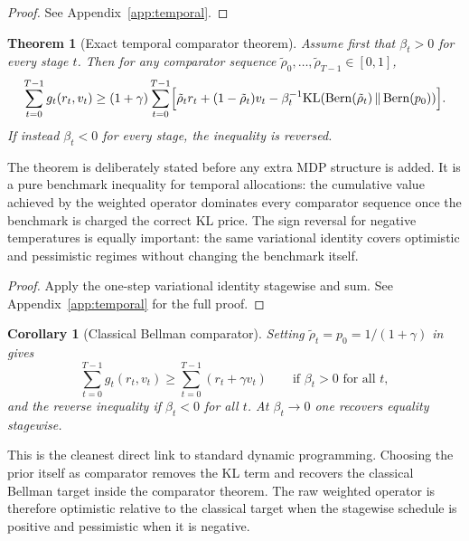 \documentclass{article}
\newtheorem{theorem}{Theorem}[section]
\newtheorem{corollary}[corollary]{Corollary}
\theoremstyle{remark}
\DeclareMathOperator{\Bern}{Bern}
\newcommand{\KL}{\mathrm{KL}}
\newcommand{\pprior}{p_0}
\newcommand{\KLbin}[2]{\KL\!\left(\Bern(#1)\,\middle\|\,\Bern(#2)\right)}
\begin{document}
\begin{proof}
See Appendix~\ref{app:temporal}.
\end{proof}

\begin{theorem}[Exact temporal comparator theorem]
\label{thm:temporal-comparator}
Assume first that $\beta_t>0$ for every stage $t$.
Then for any comparator sequence $\tilde\rho_0,\dots,\tilde\rho_{T-1}\in[0,1]$,
\begin{equation}
\sum_{t=0}^{T-1} g_t(r_t,v_t)
\ge
(1+\gamma)
\sum_{t=0}^{T-1}
\Bigl[
\tilde\rho_t r_t + (1-\tilde\rho_t)v_t - \beta_t^{-1}\KLbin{\tilde\rho_t}{\pprior}
\Bigr].
\label{eq:temporal-comparator-pos}
\end{equation}
If instead $\beta_t<0$ for every stage, the inequality is reversed.
\end{theorem}

The theorem is deliberately stated before any extra MDP structure is added.
It is a pure benchmark inequality for temporal allocations: the cumulative value achieved by the weighted operator dominates every comparator sequence once the benchmark is charged the correct KL price.
The sign reversal for negative temperatures is equally important: the same variational identity covers optimistic and pessimistic regimes without changing the benchmark itself.

\begin{proof}
Apply the one-step variational identity stagewise and sum.
See Appendix~\ref{app:temporal} for the full proof.
\end{proof}

\begin{corollary}[Classical Bellman comparator]
\label{cor:classical-comparator}
Setting $\tilde\rho_t=\pprior=1/(1+\gamma)$ in  gives
\begin{equation}
\sum_{t=0}^{T-1} g_t(r_t,v_t)
\ge
\sum_{t=0}^{T-1}(r_t+\gamma v_t)
\qquad\text{if } \beta_t>0 \text{ for all } t,
\label{eq:classical-comparator-pos}
\end{equation}
and the reverse inequality if $\beta_t<0$ for all $t$.
At $\beta_t\to 0$ one recovers equality stagewise.
\end{corollary}

This is the cleanest direct link to standard dynamic programming.
Choosing the prior itself as comparator removes the KL term and recovers the classical Bellman target inside the comparator theorem.
The raw weighted operator is therefore optimistic relative to the classical target when the stagewise schedule is positive and pessimistic when it is negative.
\end{document}
